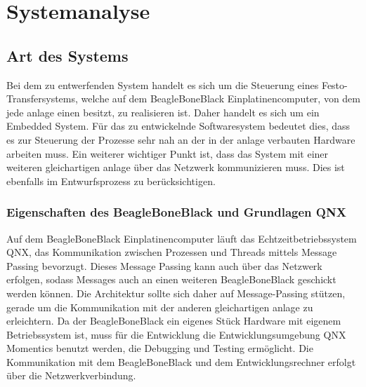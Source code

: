 














\section{Systemanalyse}\label{sec:systemanalyse}


\subsection{Art des Systems}

Bei dem zu entwerfenden System handelt es sich um die Steuerung eines Festo-Transfersystems,
welche auf dem BeagleBoneBlack Einplatinencomputer, von dem jede \gls{anlage} einen besitzt, zu realisieren ist.
Daher handelt es sich um ein Embedded System.
Für das zu entwickelnde Softwaresystem bedeutet dies, dass es zur Steuerung der Prozesse sehr nah
an der in der \gls{anlage} verbauten Hardware arbeiten muss.
Ein weiterer wichtiger Punkt ist, dass das System mit einer weiteren gleichartigen \gls{anlage} über
das Netzwerk kommunizieren muss. Dies ist ebenfalls im Entwurfsprozess zu berücksichtigen.

\subsubsection{Eigenschaften des BeagleBoneBlack und Grundlagen QNX}

Auf dem BeagleBoneBlack Einplatinencomputer läuft das Echtzeitbetriebssystem QNX, das Kommunikation
zwischen Prozessen und Threads mittels Message Passing bevorzugt.
Dieses Message Passing kann auch über das Netzwerk erfolgen, sodass Messages auch an
einen weiteren BeagleBoneBlack geschickt werden können.
Die Architektur sollte sich daher auf Message-Passing stützen, gerade um die Kommunikation mit der
anderen gleichartigen \gls{anlage} zu erleichtern.
Da der BeagleBoneBlack ein eigenes Stück Hardware mit eigenem Betriebssystem ist, muss für die
Entwicklung die Entwicklungsumgebung QNX Momentics benutzt werden, die Debugging und Testing ermöglicht.
Die Kommunikation mit dem BeagleBoneBlack und dem Entwicklungsrechner erfolgt über die Netzwerkverbindung.

